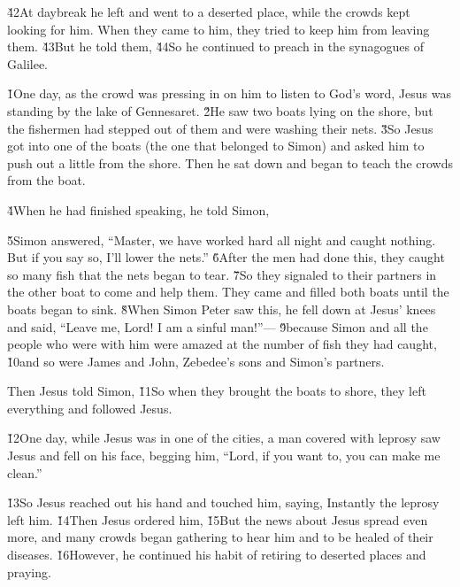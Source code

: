 \v{42}At daybreak he left and went to a deserted place, while the crowds kept looking for him. When they came to him, they tried to keep him from leaving them. \v{43}But he told them,  \v{44}So he continued to preach in the synagogues of Galilee.

\v{1}One day, as the crowd was pressing in on him to listen to God's word, Jesus was standing by the lake of Gennesaret. \v{2}He saw two boats lying on the shore, but the fishermen had stepped out of them and were washing their nets. \v{3}So Jesus got into one of the boats (the one that belonged to Simon) and asked him to push out a little from the shore. Then he sat down and began to teach the crowds from the boat.

\v{4}When he had finished speaking, he told Simon, 

\v{5}Simon answered, ``Master, we have worked hard all night and caught nothing. But if you say so, I'll lower the nets.'' \v{6}After the men had done this, they caught so many fish that the nets began to tear. \v{7}So they signaled to their partners in the other boat to come and help them. They came and filled both boats until the boats began to sink. \v{8}When Simon Peter saw this, he fell down at Jesus' knees and said, ``Leave me, Lord! I am a sinful man!''--- \v{9}because Simon and all the people who were with him were amazed at the number of fish they had caught, \v{10}and so were James and John, Zebedee's sons and Simon's partners.

Then Jesus told Simon,  \v{11}So when they brought the boats to shore, they left everything and followed Jesus.

\v{12}One day, while Jesus was in one of the cities, a man covered with leprosy saw Jesus and fell on his face, begging him, ``Lord, if you want to, you can make me clean.''

\v{13}So Jesus reached out his hand and touched him, saying,  Instantly the leprosy left him. \v{14}Then Jesus ordered him,  \v{15}But the news about Jesus spread even more, and many crowds began gathering to hear him and to be healed of their diseases. \v{16}However, he continued his habit of retiring to deserted places and praying.

